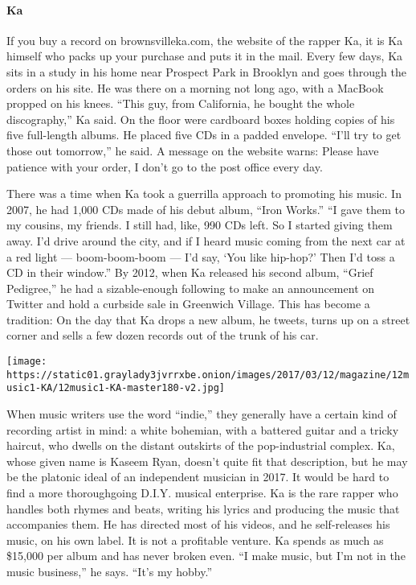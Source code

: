 \hypertarget{ka}{%
\paragraph{Ka}\label{ka}}

If you buy a record on brownsvilleka.com, the website of the rapper Ka,
it is Ka himself who packs up your purchase and puts it in the mail.
Every few days, Ka sits in a study in his home near Prospect Park in
Brooklyn and goes through the orders on his site. He was there on a
morning not long ago, with a MacBook propped on his knees. ``This guy,
from California, he bought the whole discography,'' Ka said. On the
floor were cardboard boxes holding copies of his five full-length
albums. He placed five CDs in a padded envelope. ``I'll try to get those
out tomorrow,'' he said. A message on the website warns: Please have
patience with your order, I don't go to the post office every day.

There was a time when Ka took a guerrilla approach to promoting his
music. In 2007, he had 1,000 CDs made of his debut album, ``Iron
Works.'' ``I gave them to my cousins, my friends. I still had, like, 990
CDs left. So I started giving them away. I'd drive around the city, and
if I heard music coming from the next car at a red light ---
boom-boom-boom --- I'd say, `You like hip-hop?' Then I'd toss a CD in
their window.'' By 2012, when Ka released his second album, ``Grief
Pedigree,'' he had a sizable-enough following to make an announcement on
Twitter and hold a curbside sale in Greenwich Village. This has become a
tradition: On the day that Ka drops a new album, he tweets, turns up on
a street corner and sells a few dozen records out of the trunk of his
car.

\texttt{[image: https://static01.graylady3jvrrxbe.onion/images/2017/03/12/magazine/12music1-KA/12music1-KA-master180-v2.jpg]}

When music writers use the word ``indie,'' they generally have a certain
kind of recording artist in mind: a white bohemian, with a battered
guitar and a tricky haircut, who dwells on the distant outskirts of the
pop-industrial complex. Ka, whose given name is Kaseem Ryan, doesn't
quite fit that description, but he may be the platonic ideal of an
independent musician in 2017. It would be hard to find a more
thoroughgoing D.I.Y. musical enterprise. Ka is the rare rapper who
handles both rhymes and beats, writing his lyrics and producing the
music that accompanies them. He has directed most of his videos, and he
self-releases his music, on his own label. It is not a profitable
venture. Ka spends as much as \$15,000 per album and has never broken
even. ``I make music, but I'm not in the music business,'' he says.
``It's my hobby.''

